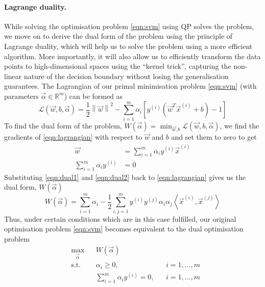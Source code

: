 \paragraph{Lagrange duality.}
	While solving the optimisation problem \eqref{eqn:svm} using QP solves the problem, we move on to derive the dual form of the problem using the principle of Lagrange duality, which will help us to solve the problem using a more efficient algorithm. More importantly, it will also allow us to efficiently transform the data points to high-dimensional spaces using the ``kernel trick'', capturing the non-linear nature of the decision boundary without losing the generalisation guarantees. The Lagrangian of our primal minimisation problem \eqref{eqn:svm} (with parameters $\vec{\alpha} \in \mathbb{R}^m$) can be formed as
	\begin{equation}
		\mathcal{L}(\vec{w}, b, \vec{\alpha}) = \frac{1}{2} \left\| \vec{w} \right\|^2 - \sum_{i=1}^{m} \alpha_i \left[ y^{(i)}\left( \vec{w}^T \vec{x}^{(i)} + b \right) - 1 \right]
	\label{eqn:lagrangian}
	\end{equation}
To find the dual form of the problem, $W(\vec{\alpha}) = \min_{\vec{w}, b} \mathcal{L}(\vec{w}, b, \vec{\alpha})$, we find the gradients of \eqref{eqn:lagrangian} with respect to $\vec{w}$ and $b$ and set them to zero to get
	\begin{align}
		\vec{w} 					& = \sum_{i = 1}^{m} \alpha_i y^{(i)} \vec{x}^{(i)} \label{eqn:dual1}\\
		\sum_{i = 1}^{m} \alpha_i y^{(i)}	& = 0 \label{eqn:dual2}
	\end{align}
Substituting \eqref{eqn:dual1} and \eqref{eqn:dual2} back to \eqref{eqn:lagrangian} gives us the dual form, $W(\vec{\alpha})$
	\begin{equation}
		W(\vec{\alpha}) = \sum_{i = 1}^{m} \alpha_i - \frac{1}{2} \sum_{i, j = 1}^{m} y^{(i)} y^{(j)} \alpha_i \alpha_j \left\langle \vec{x}^{(i)}, \vec{x}^{(j)} \right\rangle
		\label{eqn:dualForm}
	\end{equation}
Thus, under certain conditions which are in this case fulfilled, our original optimisation problem \eqref{eqn:svm} becomes equivalent to the dual optimisation problem
	\begin{equation}
	\begin{aligned}
		& \max_{\vec\alpha}
		& & W(\vec{\alpha}) \\
		& \text{s.t.}
		& & \alpha_i \geq 0, & &  i = 1, \dotsc, m \\
		& & & \sum_{i = 1}^{m} \alpha_i y^{(i)} = 0, & &  i = 1, \dotsc, m
	\label{eqn:dualOpt}
	\end{aligned}
	\end{equation}
